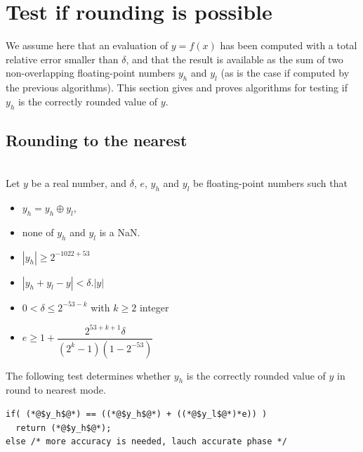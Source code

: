 \section{Test if rounding is possible\label{section:testrounding}}

We assume here that an evaluation of $y=f(x)$ has been computed with a
total relative error smaller than $\delta$, and that the result is
available as the sum of two non-overlapping floating-point numbers
$y_h$ and $y_l$ (as is the case if computed by the previous
algorithms). This section gives and proves algorithms for testing if
$y_h$ is the correctly rounded value of $y$.




\subsection{Rounding to the nearest}

\begin{theorem}
\label{th:roundingRN1}
~\\
Let $y$ be a real number, and  $\delta$, $e$, $y_h$ and $y_l$ be
  floating-point numbers such that 
  \begin{itemize}
  \item $y_h=y_h\oplus y_l$,
  \item none of $y_h$ and $y_l$ is a  NaN.
  \item $|y_h|\ge 2^{-1022+53}$ 
  \item $|y_h+y_l - y| < \delta.|y|$
  \item $0< \delta \le 2^{-53-k}$ with $k\ge 2$ integer
  \item $e\ge 1+  \dfrac{2^{53+k+1}\delta}{(2^{k}-1)(1-2^{-53})}$
\end{itemize}

The following test determines whether $y_h$ is the
  correctly rounded value of $y$ in  round to nearest mode.

\begin{lstlisting}[caption={Test for rounding to the nearest},
  firstnumber=1]
if( (*@$y_h$@*) == ((*@$y_h$@*) + ((*@$y_l$@*)*e)) )
  return (*@$y_h$@*);
else /* more accuracy is needed, lauch accurate phase */
\end{lstlisting}
\end{theorem}


